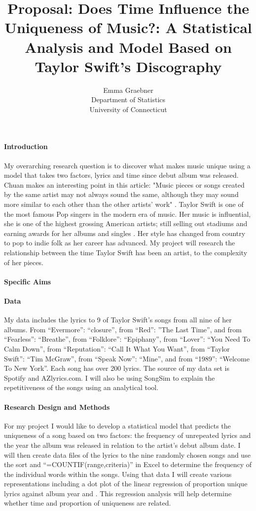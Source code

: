 \documentclass[12pt]{article}
\title{Proposal: Does Time Influence the Uniqueness of Music?: A Statistical Analysis and Model Based on Taylor Swift's Discography}
\author{Emma Graebner\\
  Department of Statistics\\
  University of Connecticut
}
\begin{document}
\maketitle


\paragraph{Introduction}
My overarching research question is to discover what makes music unique using a model that takes two factors, lyrics and time since debut album was released. Chuan makes an interesting point in this article: "Music pieces or songs created by the same artist may not always sound the same, although they may sound more similar to each other than the other artists' work" \cite{chuan2013multimodal}. Taylor Swift is one of the most famous Pop singers in the modern era of music. Her music is influential, she is one of the highest grossing American artists; still selling out stadiums and earning awards for her albums and singles \citep{fogarty2021you} . Her style has changed from country to pop to indie folk as her career has advanced. My project will research the relationship between the time Taylor Swift has been an artist, to the complexity of her pieces. \citep{sloan2021taylor} 


\citep{perone2017words}

\paragraph{Specific Aims}


\paragraph{Data}
My data includes the lyrics to 9 of Taylor Swift’s songs from all nine of her albums. From “Evermore”: “closure”, from “Red”: ”The Last Time”, and from “Fearless”: “Breathe”, from “Folklore”: “Epiphany”, from “Lover”: “You Need To Calm Down”, from “Reputation”: “Call It What You Want”, from “Taylor Swift”: “Tim McGraw”, from “Speak Now”: “Mine”, and from “1989”: “Welcome To New York”. Each song has over 200 lyrics. The source of my data set is Spotify and AZlyrics.com. I will also be using SongSim to explain the repetitiveness of the songs using an analytical tool.

\paragraph{Research Design and Methods}
For my project I would like to develop a statistical model that predicts the uniqueness of a song based on two factors: the frequency of unrepeated lyrics and the year the album was released in relation to the artist’s debut album date. I will then create data files of the lyrics to the nine randomly chosen songs and use the sort and “=COUNTIF(range,criteria)” in Excel to determine the frequency of the individual words within the songs. Using that data I will create various representations including a dot plot of the linear regression of proportion unique lyrics against album year and . This regression analysis will help determine whether time and proportion of uniqueness are related. 
\end{document}
